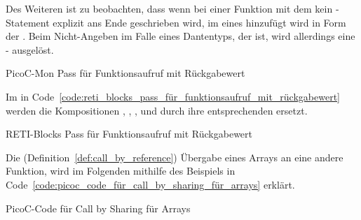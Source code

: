 Des Weiteren ist zu beobachten, dass wenn bei einer Funktion mit dem   kein -Statement explizit ans Ende geschrieben wird, im  eines hinzufügt wird in Form der  . Beim Nicht-Angeben im Falle eines Dantentyps, der   ist, wird allerdings eine - ausgelöst.

\begin{code}
  \centering
  \caption{PicoC-Mon Pass für Funktionsaufruf mit Rückgabewert}
  \label{code:picoc_mon_pass_für_funktionsaufruf_mit_rückgabewert}
\end{code}

Im  in Code~\ref{code:reti_blocks_pass_für_funktionsaufruf_mit_rückgabewert} werden die Kompositionen , , ,  und  durch ihre entsprechenden  ersetzt.

\begin{code}
  \centering
  \caption{RETI-Blocks Pass für Funktionsaufruf mit Rückgabewert}
  \label{code:reti_blocks_pass_für_funktionsaufruf_mit_rückgabewert}
\end{code}


Die  (Definition~\ref{def:call_by_reference}) Übergabe eines Arrays an eine andere Funktion, wird im Folgenden mithilfe des Beispiels in Code~\ref{code:picoc_code_für_call_by_sharing_für_arrays} erklärt.

\begin{code}
  \centering
  \caption{PicoC-Code für Call by Sharing für Arrays}
  \label{code:picoc_code_für_call_by_sharing_für_arrays}
\end{code}

